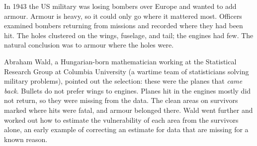\begin{historybox}
In 1943 the US military was losing bombers over Europe and wanted to add armour. Armour
is heavy, so it could only go where it mattered most. Officers examined bombers
returning from missions and recorded where they had been hit. The holes clustered on the
wings, fuselage, and tail; the engines had few. The natural conclusion was to armour
where the holes were.

Abraham Wald, a Hungarian-born mathematician working at the Statistical Research Group at
Columbia University (a wartime team of statisticians solving military problems), pointed
out the selection: these were the planes that \emph{came back}. Bullets do not prefer
wings to engines. Planes hit in the engines mostly did not return, so they were missing
from the data. The clean areas on survivors marked where hits were fatal, and armour
belonged there. Wald went further and worked out how to estimate the vulnerability of
each area from the survivors alone, an early example of correcting an estimate for data
that are missing for a known reason.
\end{historybox}

